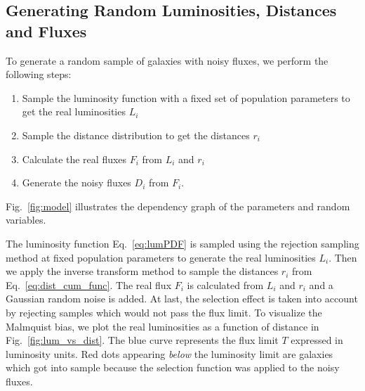 \subsection{Generating Random Luminosities, Distances and Fluxes}
\label{sec:gen_rnd_dist_fluxes}

To generate a random sample of galaxies with noisy fluxes, we perform the following steps: \begin{enumerate} \item Sample the luminosity function with a fixed set of population parameters to get the real luminosities $L_i$ \item Sample the distance distribution to get the distances $r_i$ \item Calculate the real fluxes $F_i$ from $L_i$ and $r_i$ \item Generate the noisy fluxes $D_i$ from $F_i$.
\end{enumerate} Fig.~\ref{fig:model} illustrates the dependency graph of the parameters and random variables.

The luminosity function Eq.~\ref{eq:lumPDF} is sampled using the rejection sampling method at fixed population parameters to generate the real luminosities $L_i$.
Then we apply the inverse transform method to sample the distances $r_i$ from Eq.~\ref{eq:dist_cum_func}.
The real flux $F_i$ is calculated from $L_i$ and $r_i$ and a Gaussian random noise is added.
At last, the selection effect is taken into account by rejecting samples which would not pass the flux limit.
To visualize the Malmquist bias, we plot the real luminosities as a function of distance in Fig.~\ref{fig:lum_vs_dist}.
The blue curve represents the flux limit $T$ expressed in luminosity units.
Red dots appearing \textit{below} the luminosity limit are galaxies which got into sample because the selection function was applied to the noisy fluxes.

